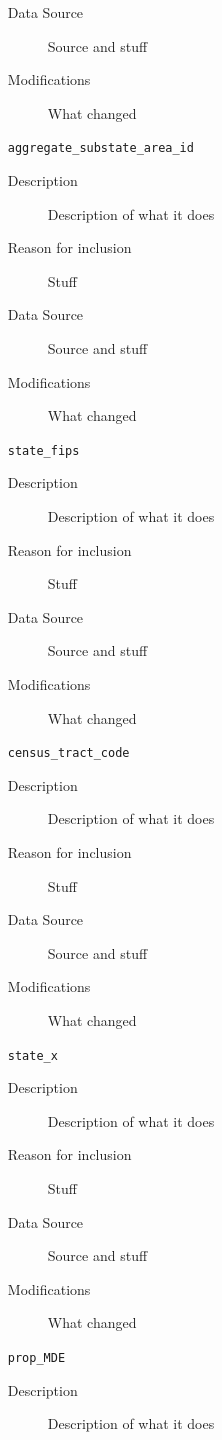 \documentclass{article}
\begin{document}
\begin{itemize}[label={}, align=left]
\begin{description}
		      \item[Data Source] Source and stuff
		      \item[Modifications] What changed
	      \end{description}
	\item[\texttt{aggregate\_substate\_area\_id}] \
	      \begin{description}
		      \item[Description] Description of what it does
		      \item[Reason for inclusion] Stuff
		      \item[Data Source] Source and stuff
		      \item[Modifications] What changed
	      \end{description}
	\item[\texttt{state\_fips}] \
	      \begin{description}
		      \item[Description] Description of what it does
		      \item[Reason for inclusion] Stuff
		      \item[Data Source] Source and stuff
		      \item[Modifications] What changed
	      \end{description}
	\item[\texttt{census\_tract\_code}] \
	      \begin{description}
		      \item[Description] Description of what it does
		      \item[Reason for inclusion] Stuff
		      \item[Data Source] Source and stuff
		      \item[Modifications] What changed
	      \end{description}
	\item[\texttt{state\_x}] \
	      \begin{description}
		      \item[Description] Description of what it does
		      \item[Reason for inclusion] Stuff
		      \item[Data Source] Source and stuff
		      \item[Modifications] What changed
	      \end{description}
	\item[\texttt{prop\_MDE}] \
	      \begin{description}
		      \item[Description] Description of what it does

\end{description}
\end{itemize}
\end{document}
